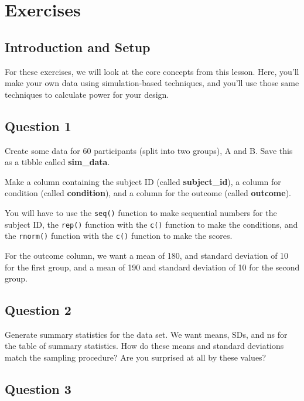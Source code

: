 \documentclass[
]{book}
\begin{document}
\hypertarget{exercises-7}{%
\section{Exercises}\label{exercises-7}}

\hypertarget{introduction-and-setup-1}{%
\subsection{Introduction and Setup}\label{introduction-and-setup-1}}

For these exercises, we will look at the core concepts from this lesson. Here, you'll make your own data using simulation-based techniques, and you'll use those same techniques to calculate power for your design.

\hypertarget{question-1-7}{%
\subsection{Question 1}\label{question-1-7}}

Create some data for 60 participants (split into two groups), A and B. Save this as a tibble called \textbf{sim\_data}.

Make a column containing the subject ID (called \textbf{subject\_id}), a column for condition (called \textbf{condition}), and a column for the outcome (called \textbf{outcome}).

You will have to use the \texttt{seq()} function to make sequential numbers for the subject ID, the \texttt{rep()} function with the \texttt{c()} function to make the conditions, and the \texttt{rnorm()} function with the \texttt{c()} function to make the scores.

For the outcome column, we want a mean of 180, and standard deviation of 10 for the first group, and a mean of 190 and standard deviation of 10 for the second group.

\hypertarget{question-2-7}{%
\subsection{Question 2}\label{question-2-7}}

Generate summary statistics for the data set. We want means, SDs, and ns for the table of summary statistics. How do these means and standard deviations match the sampling procedure? Are you surprised at all by these values?

\hypertarget{question-3-7}{%
\subsection{Question 3}\label{question-3-7}}
\end{document}
